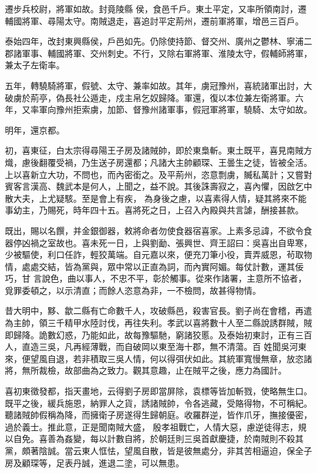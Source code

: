 \begin{pinyinscope}
 遷步兵校尉，將軍如故。封竟陵縣
 侯，食邑千戶。東土平定，又率所領南討，遷輔國將軍、尋陽太守。南賊退走，喜追討平定荊州，遷前軍將軍，增邑三百戶。



 泰始四年，改封東興縣侯，戶邑如先。仍除使持節、督交州、廣州之鬱林、寧浦二郡諸軍事、輔國將軍、交州刺史。不行，又除右軍將軍、淮陵太守，假輔師將軍，兼太子左衛率。



 五年，轉驍騎將軍，假號、太守、兼率如故。其年，虜冠豫州，喜統諸軍出討，大破虜於荊亭，偽長社公遁走，戍主帛乞奴歸降。軍還，復以本位兼左衛將軍。六
 年，又率軍向豫州拒索虜，加節、督豫州諸軍事，假冠軍將軍，驍騎、太守如故。



 明年，還京都。



 初，喜東征，白太宗得尋陽王子房及諸賊帥，即於東梟斬。東土既平，喜見南賊方熾，慮後翻覆受禍，乃生送子房還都；凡諸大主帥顧琛、王曇生之徒，皆被全活。上以喜新立大功，不問也，而內密銜之。及平荊州，恣意剽虜，贓私萬計；又嘗對賓客言漢高、魏武本是何人，上聞之，益不說。其後誅壽寂之，喜內懼，因啟乞中散大夫，上尤疑駭。至是會上有疾，
 為身後之慮，以喜素得人情，疑其將來不能事幼主，乃賜死，時年四十五。喜將死之日，上召入內殿與共言謔，酬接甚款。



 既出，賜以名饌，并金銀御器，敕將命者勿使食器宿喜家。上素多忌諱，不欲令食器停凶禍之室故也。喜未死一日，上與劉勔、張興世、齊王詔曰：吳喜出自卑寒，少被驅使，利口任詐，輕狡萬端。自元嘉以來，便充刀筆小役，賣弄威恩，茍取物情，處處交結，皆為黨與，眾中常以正直為詞，而內實阿媚。每仗計數，運其佞巧，甘
 言說色，曲以事人，不忠不平，彰於觸事。從來作諸署，主意所不協者，覓罪委頓之，以示清直；而餘人恣意為非，一不檢問，故甚得物情。



 昔大明中，黟、歙二縣有亡命數千人，攻破縣邑，殺害官長。劉子尚在會稽，再遣為主帥，領三千精甲水陸討伐，再往失利。孝武以喜將數十人至二縣說誘群賊，賊即歸降。詭數幻惑，乃能如此，故每豫驅馳，窮諸狡慝。及泰始初東討，正有三百人，直造三吳，凡再經薄戰，而自破岡以東至海十郡，無不清蕩。百
 姓聞吳河東來，便望風自退，若非積取三吳人情，何以得弭伏如此。其統軍寬慢無章，放恣諸將，無所裁檢，故部曲為之致力。觀其意趣，止在賊平之後，應力為國計。



 喜初東徵發都，指天畫地，云得劉子房即當屏除，袁標等皆加斬戮，使略無生口。既平之後，緩兵施恩，納罪人之貨，誘諸賊帥，令各逃藏，受賂得物，不可稱紀。聽諸賊帥假稱為降，而擁衛子房遂得生歸朝庭。收羅群逆，皆作爪牙，撫接優密，過於義士。推此意，正是聞南賊大盛，
 殷孝祖戰亡，人情大惡，慮逆徒得志，規以自免。喜善為姦變，每以計數自將，於朝廷則三吳首獻慶捷，於南賊則不殺其黨，頗著陰誠。當云東人恇怯，望風自散，皆是彼無處分，非其苦相逼迫，保全子房及顧琛等，足表丹誠，進退二塗，可以無患。




\end{pinyinscope}
